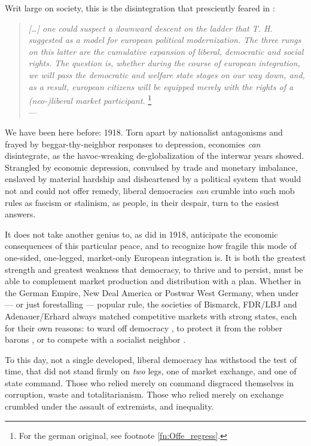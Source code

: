 \documentclass[11pt,a4paper,oneside,openright]{article}
\begin{document}
Writ large on society, this is the disintegration that \citeauthor{Offe1998} presciently feared in \citeyear{Offe1998}:
\begin{quote}
	\emph{[\ldots] one could suspect a downward descent on the ladder that T. H. \cite{Marshall-1950-aa} suggested as a model for european political modernization. 
	The three rungs on this latter are the cumulative expansion of liberal, democratic and social rights. 
	The question is, whether during the course of european integration, we will pass the democratic and welfare state stages on our way down, and, as a result, european citizens will be equipped merely with the rights of a (neo-)liberal market participant.}
	\footnote{
		For the german original, see footnote \ref{fn:Offe_regress}.
	}\\
	--- \cite[41]{Offe1998}
\end{quote}

We have been here before: 
1918. 
Torn apart by nationalist antagonisms and frayed by beggar-thy-neighbor responses to depression, economies \emph{can} disintegrate, as the havoc-wreaking de-globalization of the interwar years showed. 
Strangled by economic depression, convulsed by trade and monetary imbalance, enslaved by material hardship and disheartened by a political system that would not and could not offer remedy, liberal democracies \emph{can} crumble into such mob rules as fascism or stalinism, as people, in their despair, turn to the easiest answers.

It does not take another genius to, as \cite{Keynes1936} did in 1918, anticipate the economic consequences of this particular peace, and to recognize how fragile this mode of one-sided, one-legged, market-only European integration is. 
It is both the greatest strength and greatest weakness that democracy, to thrive and to persist, must be able to complement market production and distribution with a plan. 
Whether in the German Empire, New Deal America or  Postwar West Germany, when under --- or just forestalling --- popular rule, the societies of Bismarck, FDR/LBJ and Adenauer/Erhard always matched competitive markets with strong states, each for their own reasons: 
to ward off democracy \citep{Leibfried}, to protect it from the robber barons \citep{Wapshott2011}, or to compete with a socialist neighbor \citep{Judt2006}.

To this day, not a single developed, liberal democracy has withstood the test of time, that did not stand firmly on \emph{two} legs, one of market exchange, and one of state command. 
Those who relied merely on command disgraced themselves in corruption, waste and totalitarianism. 
Those who relied merely on exchange crumbled under the assault of extremists, and inequality. 
\end{document}
